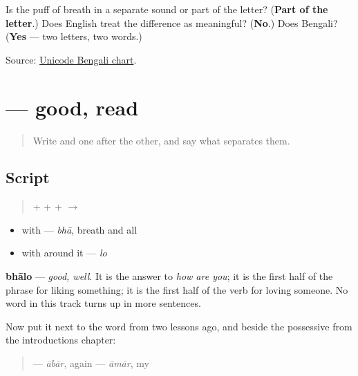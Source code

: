 \begin{tcolorbox}[breakable,colback=teal!4,colframe=teal!35!black,title={Before you move on}]
Is the puff of breath in \textbf{} a separate sound or part of the letter? (\textbf{Part of the letter}.) Does English treat the difference as meaningful? (\textbf{No}.) Does Bengali? (\textbf{Yes} — two letters, two words.)

Source: \href{https://www.unicode.org/charts/PDF/U0980.pdf}{Unicode Bengali chart}.
\end{tcolorbox}
\section[\texorpdfstring{\bn{ভালো} (bhālo)}{ভালো (bhālo)}]{ — good, read}

\label{lesson:BN-W03-bhalo-read}



\begin{quote}
Write \textbf{} and \textbf{} one after the other, and say what separates them.
\end{quote}

\subsection*{Script}
\begin{quote}
\textbf{} + \textbf{} + \textbf{} + \textbf{} $\to$ \textbf{}
\end{quote}

\begin{itemize}
\raggedright
  \item \textbf{} with \textbf{} — \emph{bhā}, breath and all
  \item \textbf{} with \textbf{} around it — \emph{lo}
\end{itemize}

\textbf{bhālo} — \emph{good, well}. It is the answer to \emph{how are you}; it is the first half of the phrase for liking something; it is the first half of the verb for loving someone. No word in this track turns up in more sentences.

Now put it next to the word from two lessons ago, and beside the possessive from the introductions chapter:

\begin{quote}
\textbf{} — \emph{ābār}, again \textbf{} — \emph{āmār}, my
\end{quote}

